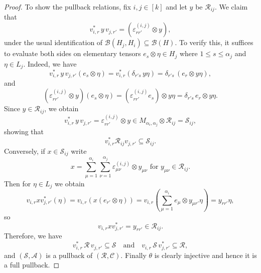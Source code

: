 \documentclass[10pt,a4paper]{amsart}
\newcommand{\A}{{\mathcal{A}}}
\newcommand{\B}{{\mathcal{B}}}
\newcommand{\C}{{\mathcal{C}}}
\newcommand{\R}{{\mathcal{R}}}
\newcommand{\eps}{\varepsilon}
\newcommand{\qand}{\quad\text{and}\quad}
\renewcommand{\S}{{\mathcal{S}}}
\begin{document}
\begin{proof}
To show the pullback relations, fix $i,j \in [k]$ and  let $y$ be $\R_{ij}$. We claim that
\[
v_{i,r}^*\,y\,v_{j,r'}=(\eps^{(i,j)}_{rr'}\otimes y),
\]
under the usual identification of $\B(H_j,H_i) \subseteq \B(H)$.
To verify this, it suffices to evaluate both sides on elementary tensors $e_s\otimes\eta\in H_j$
where $1\le s\le \alpha_j$ and $\eta\in L_j$. Indeed, we have
\[
v_{i,r}^*\,y\,v_{j,r'}(e_s\otimes\eta)
=
v_{i,r}^*(\delta_{r's}\,y\eta)
=
\delta_{r's}\,(e_r\otimes y\eta),
\]
and
\[
(\eps^{(i,j)}_{rr'}\otimes y)(e_s\otimes\eta)
=
(\eps^{(i,j)}_{rr'}e_s)\otimes y\eta
=
\delta_{r's}\,e_r\otimes y\eta.
\]
Since $y\in\R_{ij}$, we obtain
\[
v_{i,r}^*\,y\,v_{j,r'}=\eps^{(i,j)}_{rr'}\otimes y\in
M_{\alpha_i,\alpha_j}\otimes \R_{ij}=\S_{ij},
\]
showing that 
\[
v_{i,r}^*\R_{ij} v_{j,r'} \subseteq \S_{ij}.
\]
Conversely, if $x\in\S_{ij}$ write
\[
x=\sum_{\mu=1}^{\alpha_i}\sum_{\nu=1}^{\alpha_j} \eps^{(i,j)}_{\mu \nu}\otimes y_{\mu \nu}
\text{ for } y_{\mu\nu}\in\R_{ij}.
\]
Then for $\eta\in L_j$ we obtain
\[
v_{i,r}x v_{j,r'}^*(\eta)
=
v_{i,r}(x(e_{r'}\otimes\eta))
=
v_{i,r}(\sum_{\mu=1}^{\alpha_i} e_\mu\otimes y_{\mu r'}\eta)
=
y_{rr'}\eta,
\]
so
\[
v_{i,r} x v_{j,r'}^*=y_{rr'}\in\R_{ij}.
\]
Therefore, we have
\[
v_{i,r}^*\,\R\,v_{j,r'}\subseteq \S 
\qand
v_{i,r}\,\S\,v_{j,r'}^*\subseteq \R,
\]
and $(\S,\A)$ is a  pullback of $(\R,\C)$.
Finally $\theta$ is clearly injective and hence it is a full pullback.
\end{proof}
\end{document}
